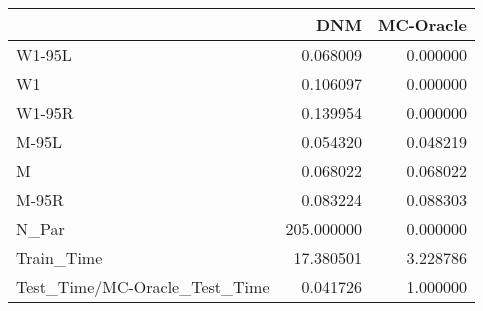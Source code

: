 \begin{tabular}{lrr}
\toprule
{} &         DNM &  MC-Oracle \\
\midrule
W1-95L                        &    0.068009 &   0.000000 \\
W1                            &    0.106097 &   0.000000 \\
W1-95R                        &    0.139954 &   0.000000 \\
M-95L                         &    0.054320 &   0.048219 \\
M                             &    0.068022 &   0.068022 \\
M-95R                         &    0.083224 &   0.088303 \\
N\_Par                         &  205.000000 &   0.000000 \\
Train\_Time                    &   17.380501 &   3.228786 \\
Test\_Time/MC-Oracle\_Test\_Time &    0.041726 &   1.000000 \\
\bottomrule
\end{tabular}
